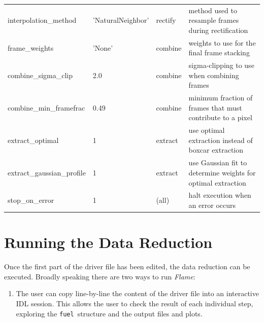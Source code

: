 \documentclass[a4paper]{article}
\newcommand{\flame}{\emph{Flame}}
\newcommand{\fuel}{\texttt{fuel}}
\begin{document}
\begin{sloppypar}
\begin{table}
{\begin{tabular}{llll}
    interpolation\_method         & 'NaturalNeighbor'  & rectify     & method used to resample frames during rectification \\
    frame\_weights                & 'None'        & combine          & weights to use for the final frame stacking \\
    combine\_sigma\_clip          & 2.0           & combine          & sigma-clipping to use when combining frames \\
    combine\_min\_framefrac       & 0.49          & combine          & minimum fraction of frames that must contribute to a pixel \\
    extract\_optimal              & 1             & extract          & use optimal extraction instead of boxcar extraction \\
    extract\_gaussian\_profile    & 1             & extract          & use Gaussian fit to determine weights for optimal extraction \\
    stop\_on\_error               & 1             & (all)            & halt execution when an error occurs \\
    \hline
  \end{tabular}
  }
\end{table}







\section{Running the Data Reduction}
\label{sec:data_reduction}

Once the first part of the driver file has been edited, the data reduction can be executed. Broadly speaking there are two ways to run \flame:
\begin{enumerate}
\item The user can copy line-by-line the content of the driver file into an interactive IDL session. This allows the user to check the result of each individual step, exploring the \fuel\ structure and the output files and plots.


\end{enumerate}
\end{sloppypar}
\end{document}
